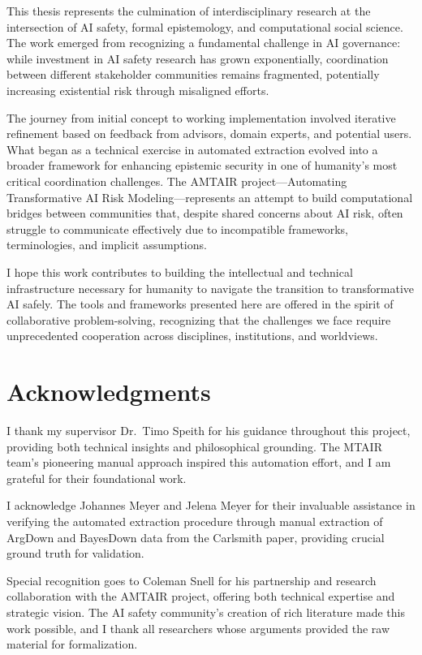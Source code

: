 \documentclass[
  11pt,
  letterpaper,
]{book}
\begin{document}
This thesis represents the culmination of interdisciplinary research at
the intersection of AI safety, formal epistemology, and computational
social science. The work emerged from recognizing a fundamental
challenge in AI governance: while investment in AI safety research has
grown exponentially, coordination between different stakeholder
communities remains fragmented, potentially increasing existential risk
through misaligned efforts.

The journey from initial concept to working implementation involved
iterative refinement based on feedback from advisors, domain experts,
and potential users. What began as a technical exercise in automated
extraction evolved into a broader framework for enhancing epistemic
security in one of humanity's most critical coordination challenges. The
AMTAIR project---Automating Transformative AI Risk Modeling---represents
an attempt to build computational bridges between communities that,
despite shared concerns about AI risk, often struggle to communicate
effectively due to incompatible frameworks, terminologies, and implicit
assumptions.

I hope this work contributes to building the intellectual and technical
infrastructure necessary for humanity to navigate the transition to
transformative AI safely. The tools and frameworks presented here are
offered in the spirit of collaborative problem-solving, recognizing that
the challenges we face require unprecedented cooperation across
disciplines, institutions, and worldviews.

\section{Acknowledgments}\label{acknowledgments-1}

I thank my supervisor Dr.~Timo Speith for his guidance throughout this
project, providing both technical insights and philosophical grounding.
The MTAIR team's pioneering manual approach inspired this automation
effort, and I am grateful for their foundational work.

I acknowledge Johannes Meyer and Jelena Meyer for their invaluable
assistance in verifying the automated extraction procedure through
manual extraction of ArgDown and BayesDown data from the Carlsmith
paper, providing crucial ground truth for validation.

Special recognition goes to Coleman Snell for his partnership and
research collaboration with the AMTAIR project, offering both technical
expertise and strategic vision. The AI safety community's creation of
rich literature made this work possible, and I thank all researchers
whose arguments provided the raw material for formalization.
\end{document}
